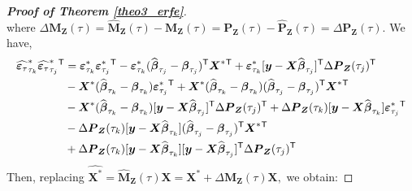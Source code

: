 \documentclass[15pt,a4paper]{article}
\newcommand{\transpose}{{}^{\text{\sffamily T}}}
\begin{document}
\begin{proof}[\textbf{Proof of Theorem \ref{theo3_erfe}}]
\begin{equation*}
\end{equation*}
where $\Delta\boldsymbol{M}_{\boldsymbol{Z}}(\tau)=\widehat{\boldsymbol{M}}_{\boldsymbol{Z}}(\tau)-\boldsymbol{M}_{\boldsymbol{Z}}(\tau)=\boldsymbol{P}_{\boldsymbol{Z}}(\tau)-\widehat{\boldsymbol{P}}_{\boldsymbol{Z}}(\tau)=\Delta\boldsymbol{P}_{\boldsymbol{Z}}(\tau).$ We have,
\begin{equation*}
\begin{split}
    \widehat{\boldsymbol{\varepsilon}_{\tau}}^{*}_{\tau_{k}}\widehat{\boldsymbol{\varepsilon}_{\tau}}^{*}_{\tau_{j}}\transpose 
    &=\boldsymbol{\varepsilon}^{*}_{\tau_{k}}\boldsymbol{\varepsilon}^{*}_{\tau_{j}}\transpose-\boldsymbol{\varepsilon}^{*}_{\tau_{k}}(\widehat{\boldsymbol{\beta}}_{\tau_{j}} - \boldsymbol{\beta}_{\tau_{j}})\transpose \boldsymbol{X}^{*}\transpose 
     + \boldsymbol{\varepsilon}^{*}_{\tau_{k}} [\boldsymbol{y}-\boldsymbol{X}\widehat{\boldsymbol{\beta}}_{\tau_{j}}]\transpose\Delta\boldsymbol{P}_{\boldsymbol{Z}}(\tau_{j})\transpose  \\
    &-\boldsymbol{X}^{*} (\widehat{\boldsymbol{\beta}}_{\tau_{k}} - \boldsymbol{\beta}_{\tau_{k}})\boldsymbol{\varepsilon}^{*}_{\tau_{j}}\transpose +
    \boldsymbol{X}^{*} (\widehat{\boldsymbol{\beta}}_{\tau_{k}} - \boldsymbol{\beta}_{\tau_{k}})(\widehat{\boldsymbol{\beta}}_{\tau_{j}} - \boldsymbol{\beta}_{\tau_{j}})\transpose\boldsymbol{X}^{*}\transpose \\
    & -\boldsymbol{X}^{*} (\widehat{\boldsymbol{\beta}}_{\tau_{k}} - \boldsymbol{\beta}_{\tau_{k}})[\boldsymbol{y}-\boldsymbol{X}\widehat{\boldsymbol{\beta}}_{\tau_{j}}]\transpose
        \Delta\boldsymbol{P}_{\boldsymbol{Z}}(\tau_{j})\transpose + \Delta\boldsymbol{P}_{\boldsymbol{Z}}(\tau_{k})[\boldsymbol{y}-\boldsymbol{X}\widehat{\boldsymbol{\beta}}_{\tau_{k}}]\boldsymbol{\varepsilon}^{*}_{\tau_{j}}\transpose  \\
    &-\Delta\boldsymbol{P}_{\boldsymbol{Z}}(\tau_{k})[\boldsymbol{y}-\boldsymbol{X}\widehat{\boldsymbol{\beta}}_{\tau_{k}}](\widehat{\boldsymbol{\beta}}_{\tau_{j}} - \boldsymbol{\beta}_{\tau_{j}})\transpose\boldsymbol{X}^{*}\transpose\\
    &+ \Delta\boldsymbol{P}_{\boldsymbol{Z}}(\tau_{k})[\boldsymbol{y}-\boldsymbol{X}\widehat{\boldsymbol{\beta}}_{\tau_{k}}][\boldsymbol{y}-\boldsymbol{X}
    \widehat{\boldsymbol{\beta}}_{\tau_{j}}]\transpose
        \Delta\boldsymbol{P}_{\boldsymbol{Z}}(\tau_{j})\transpose\\
\end{split}
\end{equation*}
Then, replacing $\boldsymbol{\widehat{\boldsymbol{X}^{*}}}=\widehat{\boldsymbol{M}}_{\boldsymbol{Z}}(\tau)\boldsymbol{X}=\boldsymbol{X}^{*} + \Delta\boldsymbol{M}_{\boldsymbol{Z}}(\tau)\boldsymbol{X},$ we obtain:


\end{proof}
\end{document}
